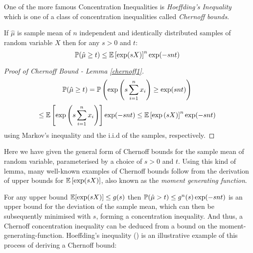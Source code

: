 One of the more famous Concentration Inequalities is \textit{Hoeffding's Inequality} which is one of a class of concentration inequalities called \textit{Chernoff bounds}.

\begin{lemma}\label{chernoff1}
If $\hat{\mu}$ is sample mean of $n$ independent and identically distributed samples of random variable $X$ then for any $s>0$ and $t$:
\[ \operatorname{\mathbb{P}}(\hat{\mu}\ge t)\le\operatorname{\mathbb{E}}\left[\exp(sX)\right]^n\exp(-snt) \]
\end{lemma}
\begin{proof}[Proof of Chernoff Bound - Lemma \ref{chernoff1}]
$$\operatorname{\mathbb{P}}(\hat{\mu}\ge t) =  \operatorname{\mathbb{P}}\left(\exp\left(s\sum_{i=1}^nx_i\right)\ge \exp(snt)\right)$$
$$\le \operatorname{\mathbb{E}}\left[\exp\left(s\sum_{i=1}^nx_i\right)\right]\exp(-snt) \le \operatorname{\mathbb{E}}\left[\exp\left(sX\right)\right]^n\exp(-snt)
$$
using Markov's inequality and the i.i.d of the samples, respectively.
\end{proof}

Here we have given the general form of Chernoff bounds for the sample mean of random variable, parameterised by a choice of $s>0$ and $t$.
Using this kind of lemma, many well-known examples of Chernoff bounds follow from the derivation of upper bounds for $\operatorname{\mathbb{E}}\left[\exp(sX)\right]$, also known as the \textit{moment generating function}.

For any upper bound $\operatorname{\mathbb{E}}[\exp(sX)]\le g(s)$ then $\operatorname{\mathbb{P}}(\hat{\mu}>t)\le g^n(s)\exp(-snt)$ is an upper bound for the deviation of the sample mean, which can then be subsequently minimised with $s$, forming a concentration inequality.
And thus, a Chernoff concentration inequality can be deduced from a bound on the moment-generating-function.
Hoeffding's inequality (\cite{hoeffding1}) is an illustrative example of this process of deriving a Chernoff bound:

